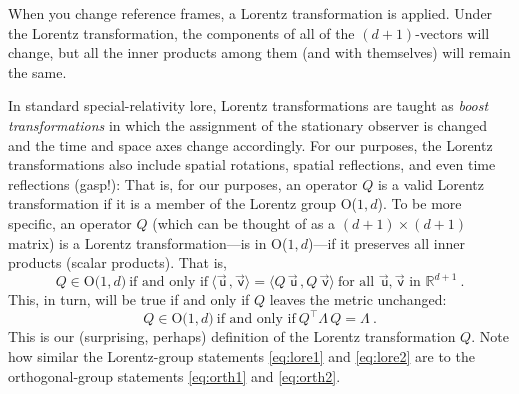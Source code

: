 \documentclass{article}
\newcommand\upvec[1]{\!\vec{\,\mathrm{#1}}}
\newcommand{\Lvec}[1]{\upvec{\mathsf{#1}}} %
\newcommand{\inner}[2]{\langle{#1}\,,{#2}\rangle}
\newcommand{\plus}{\!+\!} %
\begin{document}
When you change reference frames, a Lorentz transformation is applied.
Under the Lorentz transformation, the components of all of the $(d\plus1)$-vectors will change, but all the inner products among them (and with themselves) will remain the same.

In standard special-relativity lore, Lorentz transformations are taught as \emph{boost transformations} in which the assignment of the stationary observer is changed and the time and space axes change accordingly.
For our purposes, the Lorentz transformations also include spatial rotations, spatial reflections, and even time reflections (gasp!):
That is, for our purposes, an operator $Q$ is a valid Lorentz transformation if it is a member of the Lorentz group O($1,d$).
To be more specific, an operator $Q$ (which can be thought of as a $(d+1)\times(d+1)$ matrix) is a Lorentz transformation---is in O($1,d$)---if it preserves all inner products (scalar products). 
That is,
\begin{equation}
    Q \in \mbox{O($1,d$)} ~ \mbox{if and only if} ~ \inner{\Lvec{u}}{\Lvec{v}}=\inner{Q\,\Lvec{u}}{Q\,\Lvec{v}} ~ \mbox{for all $\Lvec{u},\Lvec{v}$ in $\mathbb{R}^{d+1}$} ~.\label{eq:lore1}
\end{equation}
This, in turn, will be true if and only if $Q$ leaves the metric unchanged:
\begin{equation}
    Q \in \mbox{O($1,d$)} ~ \mbox{if and only if} ~ Q^\top\Lambda\,Q=\Lambda ~.\label{eq:lore2}
\end{equation}
This is our (surprising, perhaps) definition of the Lorentz transformation $Q$.
Note how similar the Lorentz-group statements \eqref{eq:lore1} and \eqref{eq:lore2} are to the orthogonal-group statements \eqref{eq:orth1} and \eqref{eq:orth2}.
\end{document}
